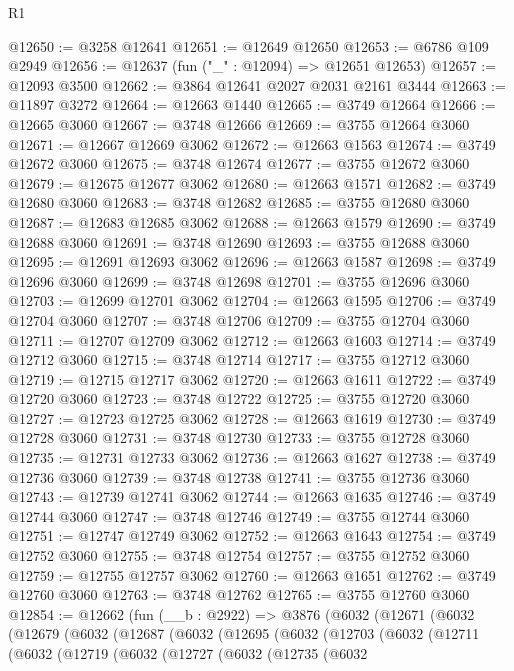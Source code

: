\begin{lexlean}{R1}
\begin{coremodule}
@12650 := @3258 @12641
@12651 := @12649 @12650
@12653 := @6786 @109 @2949
@12656 := @12637 (fun ("_" : @12094) => @12651 @12653)
@12657 := @12093 @3500
@12662 := @3864 @12641 @2027 @2031 @2161 @3444
@12663 := @11897 @3272
@12664 := @12663 @1440
@12665 := @3749 @12664
@12666 := @12665 @3060
@12667 := @3748 @12666
@12669 := @3755 @12664 @3060
@12671 := @12667 @12669 @3062
@12672 := @12663 @1563
@12674 := @3749 @12672 @3060
@12675 := @3748 @12674
@12677 := @3755 @12672 @3060
@12679 := @12675 @12677 @3062
@12680 := @12663 @1571
@12682 := @3749 @12680 @3060
@12683 := @3748 @12682
@12685 := @3755 @12680 @3060
@12687 := @12683 @12685 @3062
@12688 := @12663 @1579
@12690 := @3749 @12688 @3060
@12691 := @3748 @12690
@12693 := @3755 @12688 @3060
@12695 := @12691 @12693 @3062
@12696 := @12663 @1587
@12698 := @3749 @12696 @3060
@12699 := @3748 @12698
@12701 := @3755 @12696 @3060
@12703 := @12699 @12701 @3062
@12704 := @12663 @1595
@12706 := @3749 @12704 @3060
@12707 := @3748 @12706
@12709 := @3755 @12704 @3060
@12711 := @12707 @12709 @3062
@12712 := @12663 @1603
@12714 := @3749 @12712 @3060
@12715 := @3748 @12714
@12717 := @3755 @12712 @3060
@12719 := @12715 @12717 @3062
@12720 := @12663 @1611
@12722 := @3749 @12720 @3060
@12723 := @3748 @12722
@12725 := @3755 @12720 @3060
@12727 := @12723 @12725 @3062
@12728 := @12663 @1619
@12730 := @3749 @12728 @3060
@12731 := @3748 @12730
@12733 := @3755 @12728 @3060
@12735 := @12731 @12733 @3062
@12736 := @12663 @1627
@12738 := @3749 @12736 @3060
@12739 := @3748 @12738
@12741 := @3755 @12736 @3060
@12743 := @12739 @12741 @3062
@12744 := @12663 @1635
@12746 := @3749 @12744 @3060
@12747 := @3748 @12746
@12749 := @3755 @12744 @3060
@12751 := @12747 @12749 @3062
@12752 := @12663 @1643
@12754 := @3749 @12752 @3060
@12755 := @3748 @12754
@12757 := @3755 @12752 @3060
@12759 := @12755 @12757 @3062
@12760 := @12663 @1651
@12762 := @3749 @12760 @3060
@12763 := @3748 @12762
@12765 := @3755 @12760 @3060
@12854 := @12662
    (fun (__b : @2922) =>
    @3876
      (@6032
        (@12671
          (@6032
            (@12679
              (@6032
                (@12687
                  (@6032
                    (@12695
                      (@6032
                        (@12703
                          (@6032
                            (@12711
                              (@6032
                                (@12719
                                  (@6032
                                    (@12727
                                      (@6032
                                        (@12735
                                          (@6032

\end{coremodule}
\end{lexlean}
